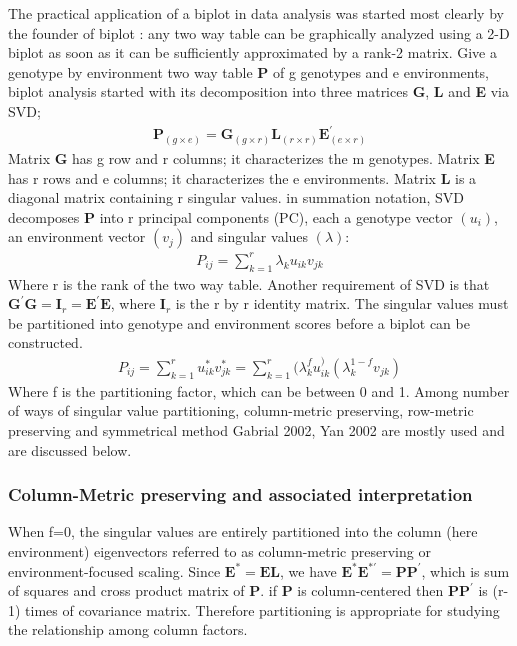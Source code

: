The practical application of a biplot in data analysis was started most clearly by the founder of biplot \citep{GABRIEL1971}: any two way table can be graphically analyzed using a 2-D biplot as soon as it can be sufficiently approximated by a rank-2 matrix. Give a genotype by environment two way table \textbf{P} of g genotypes and e environments,  biplot analysis started with its decomposition into three matrices \textbf{G}, \textbf{L} and \textbf{E} via SVD;
\begin{eqnarray}
\textbf{P}_{(g\times e)}=\textbf{G}_{(g\times r)}\textbf{L}_{(r\times r)}\textbf{E}_{(e\times r)}^\prime
\end{eqnarray}
Matrix \textbf{G} has g row and r columns; it characterizes the m genotypes. Matrix \textbf{E} has r rows and e columns; it characterizes the e environments. Matrix \textbf{L} is a diagonal matrix containing r singular values. in summation notation, SVD decomposes \textbf{P} into r principal components (PC), each a genotype vector $(u_i)$, an environment vector $(v_j)$ and singular values $(\lambda)$:
\begin{eqnarray}
P_{ij}=\sum_{k=1}^r \lambda_k u_{ik}v_{jk}
\end{eqnarray}
Where r is the rank of the two way table. Another requirement of SVD is that $\textbf{G}^\prime\textbf{G}=\textbf{I}_r=\textbf{E}^\prime\textbf{E}$, where $\textbf{I}_r$ is the r by r identity matrix.
 The singular values must be partitioned into genotype and environment scores before a biplot can be constructed.
 \begin{eqnarray}
 P_{ij}=\sum_{k=1}^r  u_{ik}^*v_{jk}^*=\sum_{k=1}^r (\lambda_k^fu_{ik}^)(\lambda_k^{1-f}v_{jk})
 \end{eqnarray}
 Where f is the partitioning factor, which can be between 0 and 1. Among number of ways of singular value partitioning, column-metric preserving, row-metric preserving and symmetrical method {Gabrial 2002, Yan 2002}  are mostly used and are discussed below.
  \subsubsection{Column-Metric preserving and associated interpretation}
 When f=0, the singular values are entirely partitioned into the column (here environment) eigenvectors referred to as column-metric preserving or environment-focused scaling. Since $\textbf{E}^*=\textbf{EL}$, we have $\textbf{E}^*\textbf{E}^{*\prime}=\textbf{PP}^\prime$, which is sum of squares and cross product matrix of \textbf{P}. if \textbf{P} is column-centered then $\textbf{PP}^\prime$ is (r-1) times of covariance matrix. Therefore partitioning is appropriate for studying the relationship among column factors.
